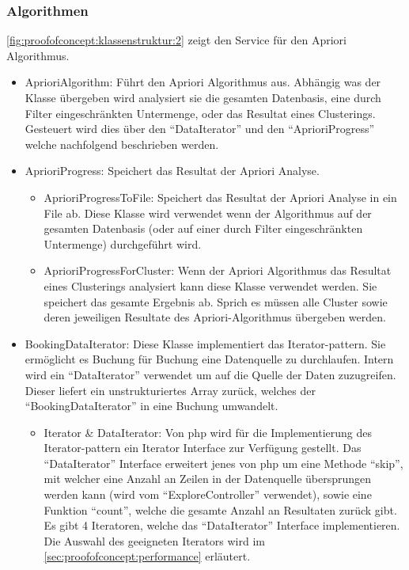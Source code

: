 \subsubsection{Algorithmen}
\label{sec:proofofconcept:klassenstruktur:algorithmen}
\cref{fig:proofofconcept:klassenstruktur:2} zeigt den Service für den Apriori Algorithmus.
\begin{itemize}
	\item AprioriAlgorithm: Führt den Apriori Algorithmus aus. Abhängig was der Klasse übergeben wird analysiert sie die gesamten Datenbasis, eine durch Filter eingeschränkten Untermenge, oder das Resultat eines Clusterings. Gesteuert wird dies über den "`DataIterator"' und den "`AprioriProgress"' welche nachfolgend beschrieben werden.
	\item AprioriProgress: Speichert das Resultat der Apriori Analyse. 
	\begin{itemize}
		\item AprioriProgressToFile: Speichert das Resultat der Apriori Analyse in ein File ab. Diese Klasse wird verwendet wenn der Algorithmus auf der gesamten Datenbasis (oder auf einer durch Filter eingeschränkten Untermenge) durchgeführt wird. 
		\item AprioriProgressForCluster: Wenn der Apriori Algorithmus das Resultat eines Clusterings analysiert kann diese Klasse verwendet werden. Sie speichert das gesamte Ergebnis ab. Sprich es müssen alle Cluster sowie deren jeweiligen Resultate des Apriori-Algorithmus übergeben werden.
	\end{itemize}
	\item BookingDataIterator: Diese Klasse implementiert das Iterator-\gls{pattern}. Sie ermöglicht es Buchung für Buchung eine Datenquelle zu durchlaufen. Intern wird ein "`DataIterator"' verwendet um auf die Quelle der Daten zuzugreifen. Dieser liefert ein unstrukturiertes Array zurück, welches der "`BookingDataIterator"' in eine Buchung umwandelt.
		\begin{itemize}
			\item Iterator \& DataIterator: Von \gls{php} wird für die Implementierung des Iterator-\gls{pattern} ein Iterator Interface zur Verfügung gestellt. Das "`DataIterator"' Interface erweitert jenes von \gls{php} um eine Methode "`skip"', mit welcher eine Anzahl an Zeilen in der Datenquelle übersprungen werden kann (wird vom "`ExploreController"' verwendet), sowie eine Funktion "`count"', welche die gesamte Anzahl an Resultaten zurück gibt. Es gibt 4 Iteratoren, welche das "`DataIterator"' Interface implementieren. Die Auswahl des geeigneten Iterators wird im \cref{sec:proofofconcept:performance}  erläutert.

\end{itemize}
\end{itemize}
